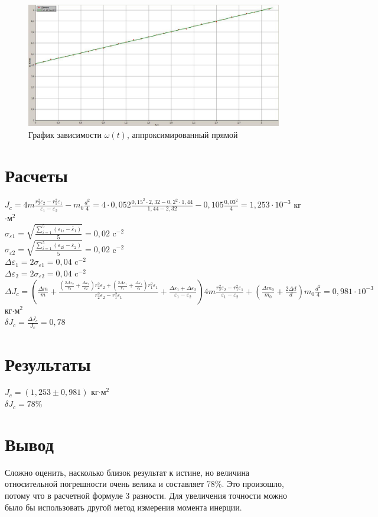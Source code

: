 \documentclass[12pt]{article}
\begin{document}
	\begin{figure}[H]
		\centering
		\includegraphics[scale=0.45]{graph2}
		\caption{График зависимости $\omega(t)$, аппроксимированный прямой}
	\end{figure}
	\section{Расчеты}
	$J_c=4m\frac{r_2^2\varepsilon_{2}-r_1^2\varepsilon_{1}}{\varepsilon_{1}-\varepsilon_{2}}-m_0\frac{d^2}{4}=4\cdot0{,}052\frac{0{,}15^2\cdot2{,}32-0{,}2^2\cdot1{,}44}{1{,}44-2{,}32}-0{,}105\frac{0{,}03^2}{4}=1{,}253\cdot10^{-3}$ кг$\cdot$м$^2$\\
	$\sigma_{\varepsilon1}=\sqrt{\frac{\sum\limits_{i=1}^5(\varepsilon_{1i}-\overline{\varepsilon}_{1})}{5}}=0{,}02$ c$^{-2}$\\
	$\sigma_{\varepsilon2}=\sqrt{\frac{\sum\limits_{i=1}^5(\varepsilon_{2i}-\overline{\varepsilon}_{2})}{5}}=0{,}02$ c$^{-2}$\\
	$\Delta\varepsilon_{1}=2\sigma_{\varepsilon1}=0{,}04$ c$^{-2}$\\
	$\Delta\varepsilon_{2}=2\sigma_{\varepsilon2}=0{,}04$ c$^{-2}$\\
	$\Delta J_c=(\frac{\Delta m}{m}+\frac{(\frac{2\Delta r_2}{r_2}+\frac{\Delta\varepsilon_{2}}{\varepsilon_{2}})r_2^2\varepsilon_{2}+(\frac{2\Delta r_1}{r_1}+\frac{\Delta\varepsilon_{1}}{\varepsilon_{1}})r_1^2\varepsilon_{1}}{r_2^2\varepsilon_{2}-r_1^2\varepsilon_{1}}+\frac{\Delta\varepsilon_{1}+\Delta\varepsilon_{2}}{\varepsilon_{1}-\varepsilon_{2}})4m\frac{r_2^2\varepsilon_{2}-r_1^2\varepsilon_{1}}{\varepsilon_{1}-\varepsilon_2}+(\frac{\Delta m_0}{m_0}+\frac{2\Delta d}{d})m_0\frac{d^2}{4}=0{,}981\cdot10^{-3}$ кг$\cdot$м$^2$\\
	$\delta J_c=\frac{\Delta J_c}{J_c}=0{,}78$\\
	\section{Результаты}
	$J_c=(1{,}253\pm0{,}981)$ кг$\cdot$м$^2$\\
	$\delta J_c=78\%$\\
	\section{Вывод}
	Сложно оценить, насколько близок результат к истине, но величина относительной погрешности очень велика и составляет 78\%. Это произошло, потому что в расчетной формуле 3 разности. Для увеличения точности можно было бы использовать другой метод измерения момента инерции. 
\end{document}
